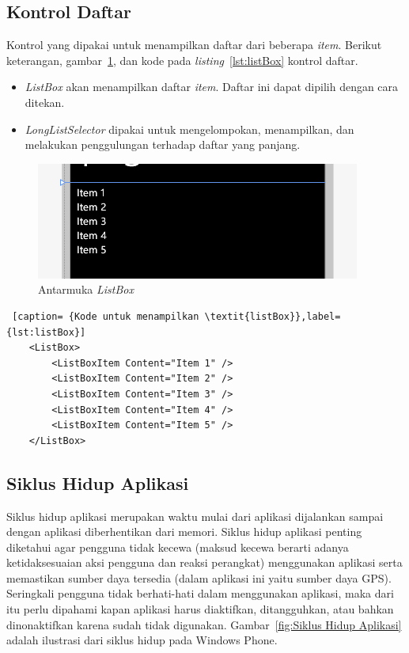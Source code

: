 \newpage

\subsection{Kontrol Daftar \cite{MSDN}}
\label{subsubsec:Kontrol Daftar}
\hspace{0.5cm} Kontrol yang dipakai untuk menampilkan daftar dari beberapa \textit{item}. Berikut keterangan, gambar~\ref{fig:antarmukaListBox}, dan kode pada \textit{listing}~\ref{lst:listBox} kontrol daftar. 

\begin{itemize}
	\item \textit{ListBox} akan menampilkan daftar \textit{item}. Daftar ini dapat dipilih dengan cara ditekan.
	\item \textit{LongListSelector} dipakai untuk mengelompokan, menampilkan, dan melakukan penggulungan terhadap daftar yang panjang.
\end{itemize}

\begin{figure}[h]
	\centering
		\includegraphics[scale=0.7]{Gambar/kontrol/listBox.PNG}
	\caption{Antarmuka \textit{ListBox}}
	\label{fig:antarmukaListBox}
\end{figure}

\begin{lstlisting} [caption= {Kode untuk menampilkan \textit{listBox}},label={lst:listBox}]
	<ListBox>
		<ListBoxItem Content="Item 1" />
		<ListBoxItem Content="Item 2" />
		<ListBoxItem Content="Item 3" />
		<ListBoxItem Content="Item 4" />
		<ListBoxItem Content="Item 5" />
	</ListBox>
\end{lstlisting}

\subsection{Siklus Hidup Aplikasi \cite{MSDN}}
\label{subsec:Siklus Hidup Aplikasi}
\hspace{0.5cm} Siklus hidup aplikasi merupakan waktu mulai dari aplikasi dijalankan sampai dengan aplikasi diberhentikan dari memori. Siklus hidup aplikasi penting diketahui agar pengguna tidak kecewa (maksud kecewa berarti adanya ketidaksesuaian aksi pengguna dan reaksi perangkat) menggunakan aplikasi serta memastikan sumber daya tersedia (dalam aplikasi ini yaitu sumber daya GPS). Seringkali pengguna tidak berhati-hati dalam menggunakan aplikasi, maka dari itu perlu dipahami kapan aplikasi harus diaktifkan, ditangguhkan, atau bahkan dinonaktifkan karena sudah tidak digunakan. Gambar~\ref{fig:Siklus Hidup Aplikasi} adalah ilustrasi dari siklus hidup pada Windows Phone.

